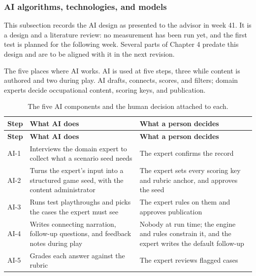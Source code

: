 \subsubsection{AI algorithms, technologies, and models}

This subsection records the AI design as presented to the advisor in week 41. It is a design and a literature review: no measurement has been run yet, and the first test is planned for the following week. Several parts of Chapter 4 predate this design and are to be aligned with it in the next revision.

The five places where AI works. AI is used at five steps, three while content is authored and two during play. AI drafts, connects, scores, and filters; domain experts decide occupational content, scoring keys, and publication.

{\small
\begin{longtable}{|>{\raggedright\arraybackslash}p{}|>{\raggedright\arraybackslash}p{}|>{\raggedright\arraybackslash}p{}|}
\caption{The five AI components and the human decision attached to each.} \\
\hline
\textbf{Step} & \textbf{What AI does} & \textbf{What a person decides} \\ \hline
\endfirsthead
\hline
\textbf{Step} & \textbf{What AI does} & \textbf{What a person decides} \\ \hline
\endhead
AI-1 & Interviews the domain expert to collect what a scenario seed needs & The expert confirms the record \\ \hline
AI-2 & Turns the expert's input into a structured game seed, with the content administrator & The expert sets every scoring key and rubric anchor, and approves the seed \\ \hline
AI-3 & Runs test playthroughs and picks the cases the expert must see & The expert rules on them and approves publication \\ \hline
AI-4 & Writes connecting narration, follow-up questions, and feedback notes during play & Nobody at run time; the engine and rules constrain it, and the expert writes the default follow-up \\ \hline
AI-5 & Grades each answer against the rubric & The expert reviews flagged cases \\ \hline
\end{longtable}
}

